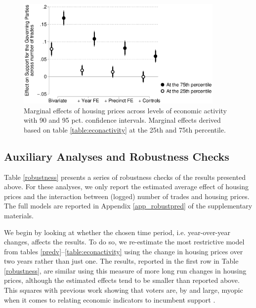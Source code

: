\documentclass[12pt,a4paper]{article}
\begin{document}
	
	\begin{figure}[htbp!]
		\includegraphics[width=0.9\textwidth]{../figures/localactivity.eps}
		\centering
		\caption{Marginal effects of housing prices across levels of economic activity with 90 and 95 pct. confidence intervals.  Marginal effects derived based on table \ref{table:econactivity} at the 25th and 75th percentile.}\label{localactivity}
	\end{figure}
	
	
	
	\subsection{Auxiliary Analyses and Robustness Checks}
	Table \ref{robustness} presents a series of robustness checks of the results presented above. For these analyses, we only report the estimated average effect of housing prices and the interaction between (logged) number of trades and housing prices. The full models are reported in Appendix \ref{app_robustpred} of the supplementary materials.
	
	
	
	We begin by looking at whether the chosen time period, i.e. year-over-year changes, affects the results. To do so, we re-estimate the most restrictive model from tables \ref{predv}--\ref{table:econactivity} using the change in housing prices over two years rather than just one. The results, reported in the first row in Table \ref{robustness}, are similar using this measure of more long run changes in housing prices, although the estimated effects tend to be smaller than reported above. This squares with previous work showing that voters are, by and large, myopic when it comes to relating economic indicators to incumbent support \citep{healy2009myopic,healy2014substituting}.
	
\end{document}
